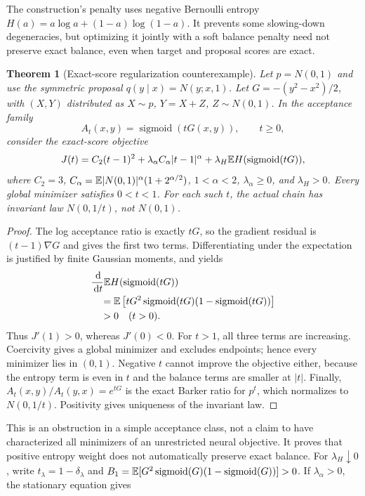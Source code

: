 \documentclass[pdflatex,iicol,sn-mathphys-ay]{sn-jnl}
\newtheorem{theorem}{Theorem}[section]
\theoremstyle{definition}\newtheorem{definition}[theorem]{Definition}
\theoremstyle{remark}\newtheorem{remark}[theorem]{Remark}
\numberwithin{equation}{section}
\newcommand{\dd}{\,\mathrm d}\newcommand{\cA}{c_\alpha}\newcommand{\sg}{\operatorname{sigmoid}}
\newcommand{\1}{\mathbf 1}
\begin{document}
The construction's penalty uses negative Bernoulli entropy
$H(a)=a\log a+(1-a)\log(1-a)$.
It prevents some slowing-down degeneracies, but optimizing it jointly with a soft balance penalty need not preserve exact balance, even when target and proposal scores are exact.

\begin{theorem}[Exact-score regularization counterexample]\label{thm:entropy}
Let $p=N(0,1)$ and use the symmetric proposal $q(y\mid x)=N(y;x,1)$. Let $G=-(y^2-x^2)/2$, with $(X,Y)$ distributed as $X\sim p$, $Y=X+Z$, $Z\sim N(0,1)$. In the acceptance family
\begin{equation}
A_t(x,y)=\sg(tG(x,y)),\qquad t\ge0,\label{eq:temperedaccept}
\end{equation}
consider the \emph{exact-score} objective
\begin{equation}
J(t)=C_2(t-1)^2+\lambda_\alpha C_\alpha|t-1|^\alpha
+\lambda_H\E H(\sg(tG)),\label{eq:entropyobjective}
\end{equation}
where $C_2=3$, $C_\alpha=\mathbb E|N(0,1)|^\alpha(1+2^{\alpha/2})$, $1<\alpha<2$, $\lambda_\alpha\ge0$, and $\lambda_H>0$. Every global minimizer satisfies $0<t<1$. For each such $t$, the actual chain has invariant law $N(0,1/t)$, not $N(0,1)$.
\end{theorem}
\begin{proof}
The log acceptance ratio is exactly $tG$, so the gradient residual is $(t-1)\nabla G$ and gives the first two terms. Differentiating under the expectation is justified by finite Gaussian moments, and yields
\begin{equation}
\begin{aligned}
&\frac{\dd}{\dd t}\E H(\sg(tG))\\
&\quad=\E\left[tG^2\sg(tG)(1-\sg(tG))\right]\\
&\quad>0\quad(t>0).
\end{aligned}\label{eq:entropyderivative}
\end{equation}
Thus $J'(1)>0$, whereas $J'(0)<0$. For $t>1$, all three terms are increasing. Coercivity gives a global minimizer and excludes endpoints; hence every minimizer lies in $(0,1)$. Negative $t$ cannot improve the objective either, because the entropy term is even in $t$ and the balance terms are smaller at $|t|$. Finally, $A_t(x,y)/A_t(y,x)=e^{tG}$ is the exact Barker ratio for $p^t$, which normalizes to $N(0,1/t)$. Positivity gives uniqueness of the invariant law.
\end{proof}
This is an obstruction in a simple acceptance class, not a claim to have characterized all minimizers of an unrestricted neural objective. It proves that positive entropy weight does not automatically preserve exact balance. For $\lambda_H\downarrow0$, write $t_\lambda=1-\delta_\lambda$ and $B_1=\E[G^2\sg(G)(1-\sg(G))]>0$. If $\lambda_\alpha>0$, the stationary equation gives
\end{document}
